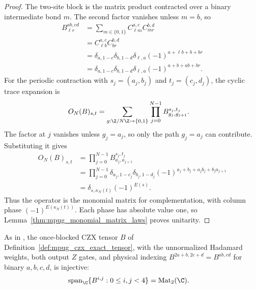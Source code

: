 \begin{proof}
    \leanok
    The two-site block is the matrix product contracted over a binary
    intermediate bond $m$. The second factor vanishes unless $m=b$, so
    \begin{align}
        B^{ab,cd}_{\ell r}
         & =\sum_{m\in\{0,1\}}C^{a,c}_{\ell m}C^{b,d}_{mr} \\
         & =C^{a,c}_{\ell b}C^{b,d}_{br}                   \\
         & =\delta_{a,1-c}\delta_{b,1-d}\delta_{\ell,a}
        (-1)^{a+\ell b+b+br}                               \\
         & =\delta_{a,1-c}\delta_{b,1-d}\delta_{\ell,a}
        (-1)^{a+b+ab+br}.
    \end{align}
    For the periodic contraction with $s_j=(a_j,b_j)$ and
    $t_j=(c_j,d_j)$, the cyclic trace expansion is
    \begin{align}
        O_N(B)_{s,t}
         & =\sum_{g:\Z/N\Z\to\{0,1\}}
        \prod_{j=0}^{N-1}B^{s_j,t_j}_{g_j,g_{j+1}}.
    \end{align}
    The factor at $j$ vanishes unless $g_j=a_j$, so only the path
    $g_j=a_j$ can contribute. Substituting it gives
    \begin{align}
        O_N(B)_{s,t}
         & =\prod_{j=0}^{N-1}B^{s_j,t_j}_{a_j,a_{j+1}} \\
         & =\prod_{j=0}^{N-1}
        \delta_{a_j,1-c_j}\delta_{b_j,1-d_j}
        (-1)^{a_j+b_j+a_jb_j+b_ja_{j+1}}               \\
         & =\delta_{s,\kappa_N(t)}(-1)^{E(s)}.
    \end{align}
    Thus the operator is the monomial matrix for complementation, with
    column phase $(-1)^{E(\kappa_N(t))}$. Each phase has absolute value one,
    so Lemma~\ref{thm:mpug_monomial_matrix_laws} proves unitarity.
\end{proof}

\begin{lemma}
    \label{thm:mpug_czx_exact_tensor_injective}
    \leanok
    As in \cite[lines~4505--4547]{FrancoRubio2025MPUGauging}, the
    once-blocked CZX tensor $B$ of Definition~\ref{def:mpug_czx_exact_tensor},
    with the unnormalized Hadamard weights, both output $Z$ gates, and
    physical indexing $B^{2a+b,2c+d}=B^{ab,cd}$ for binary $a,b,c,d$, is
    injective:
    \begin{align}
        \operatorname{span}_{\C}\{B^{i,j}:0\leq i,j<4\}
         & =\operatorname{Mat}_2(\C).
    \end{align}
\end{lemma}

